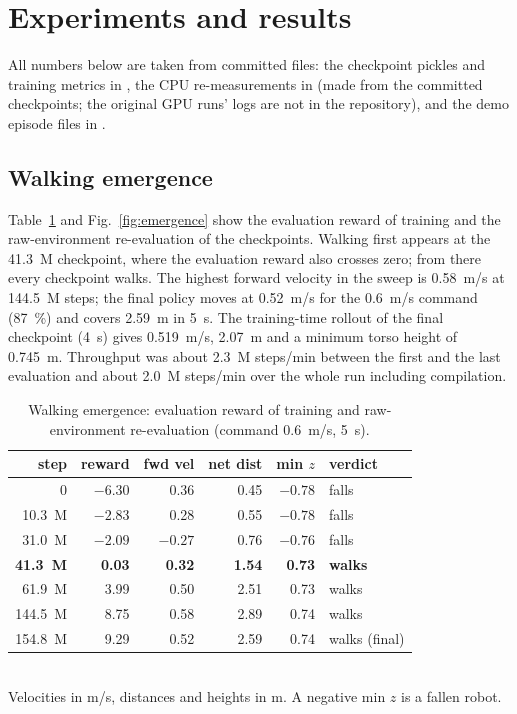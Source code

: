 \documentclass[conference,10pt]{IEEEtran}
\begin{document}
\section{Experiments and results}\label{sec:results}
All numbers below are taken from committed files: the checkpoint pickles and training metrics in
, the CPU re-measurements in  (made from the committed checkpoints; the
original GPU runs' logs are not in the repository), and the demo episode files in .

\subsection{Walking emergence}\label{sec:res-walk}
Table~\ref{tab:emergence} and Fig.~\ref{fig:emergence} show the evaluation reward of training and the raw-environment
re-evaluation of the checkpoints. Walking first appears at the 41.3~M checkpoint, where the evaluation reward also
crosses zero; from there every checkpoint walks. The highest forward velocity in the sweep is 0.58~m/s at 144.5~M steps;
the final policy moves at 0.52~m/s for the 0.6~m/s command (87~\%) and covers 2.59~m in 5~s. The training-time rollout
of the final checkpoint (4~s) gives 0.519~m/s, 2.07~m and a minimum torso height of 0.745~m. Throughput was about 2.3~M
steps/min between the first and the last evaluation and about 2.0~M steps/min over the whole run including compilation.

\begin{table}[t]
\centering
\caption{Walking emergence: evaluation reward of training and raw-environment re-evaluation (command 0.6~m/s, 5~s).}
\label{tab:emergence}
\setlength{\tabcolsep}{4pt}
\begin{tabular}{rrrrrl}
\toprule
step & reward & fwd vel & net dist & min $z$ & verdict\\
\midrule
0 & $-6.30$ & 0.36 & 0.45 & $-0.78$ & falls\\
10.3~M & $-2.83$ & 0.28 & 0.55 & $-0.78$ & falls\\
31.0~M & $-2.09$ & $-0.27$ & 0.76 & $-0.76$ & falls\\
\textbf{41.3~M} & \textbf{0.03} & \textbf{0.32} & \textbf{1.54} & \textbf{0.73} & \textbf{walks}\\
61.9~M & 3.99 & 0.50 & 2.51 & 0.73 & walks\\
144.5~M & 8.75 & 0.58 & 2.89 & 0.74 & walks\\
154.8~M & 9.29 & 0.52 & 2.59 & 0.74 & walks (final)\\
\bottomrule
\end{tabular}
\\[1mm]{\footnotesize Velocities in m/s, distances and heights in m. A negative min $z$ is a fallen robot.}
\end{table}
\end{document}
